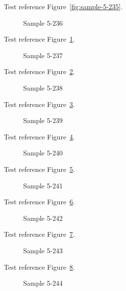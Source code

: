 Test reference Figure~\ref{fig:sample-5-235}.

\begin{figure}[tbhp]
\caption{Sample 5-236}
\label{fig:sample-5-236}
\end{figure}

Test reference Figure~\ref{fig:sample-5-236}.

\begin{figure}[tbhp]
\caption{Sample 5-237}
\label{fig:sample-5-237}
\end{figure}

Test reference Figure~\ref{fig:sample-5-237}.

\begin{figure}[tbhp]
\caption{Sample 5-238}
\label{fig:sample-5-238}
\end{figure}

Test reference Figure~\ref{fig:sample-5-238}.

\begin{figure}[tbhp]
\caption{Sample 5-239}
\label{fig:sample-5-239}
\end{figure}

Test reference Figure~\ref{fig:sample-5-239}.

\begin{figure}[tbhp]
\caption{Sample 5-240}
\label{fig:sample-5-240}
\end{figure}

Test reference Figure~\ref{fig:sample-5-240}.

\begin{figure}[tbhp]
\caption{Sample 5-241}
\label{fig:sample-5-241}
\end{figure}

Test reference Figure~\ref{fig:sample-5-241}.

\begin{figure}[tbhp]
\caption{Sample 5-242}
\label{fig:sample-5-242}
\end{figure}

Test reference Figure~\ref{fig:sample-5-242}.

\begin{figure}[tbhp]
\caption{Sample 5-243}
\label{fig:sample-5-243}
\end{figure}

Test reference Figure~\ref{fig:sample-5-243}.

\begin{figure}[tbhp]
\caption{Sample 5-244}
\label{fig:sample-5-244}
\end{figure}

